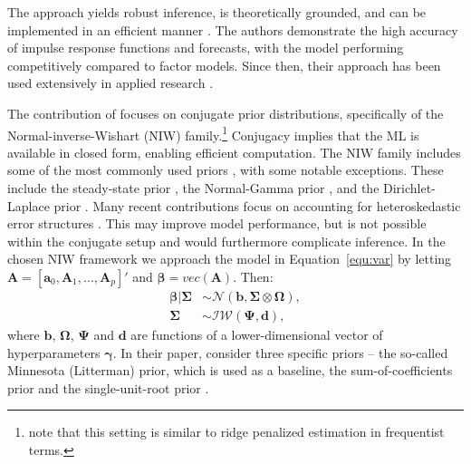 \documentclass[article,nojss]{jss} %
\begin{document}
The approach yields robust inference, is theoretically grounded, and can be implemented in an efficient manner \citep{giannone2015}. The authors demonstrate the high accuracy of impulse response functions and forecasts, with the model performing competitively compared to factor models. Since then, their approach has been used extensively in applied research \citep[see e.g.,][]{miranda-agrippino2015, baumeister2016, altavilla2018, nelson2018, altavilla2019}.

The contribution of \cite{giannone2015} focuses on conjugate prior distributions, specifically of the Normal-inverse-Wishart (NIW) family.\footnote{\cite{demol2008} note that this setting is similar to ridge penalized estimation in frequentist terms.}
Conjugacy implies that the ML is available in closed form, enabling efficient computation.
The NIW family includes some of the most commonly used priors \citep{koop2010, karlsson2013}, with some notable exceptions. These include the steady-state prior \citep{villani2009}, the Normal-Gamma prior \citep{griffin2010, huber2019}, and the Dirichlet-Laplace prior \citep{bhattacharya2015}.
Many recent contributions focus on accounting for heteroskedastic error structures \citep{clark2011, kastner2014, carriero2016}. This may improve model performance, but is not possible within the conjugate setup and would furthermore complicate inference.
In the chosen NIW framework we approach the model in Equation~\ref{equ:var} by letting $\boldsymbol{A} = \left[ \boldsymbol{a}_0, \boldsymbol{A}_1, \dots, \boldsymbol{A}_p \right]'$ and $\boldsymbol{\beta} = vec(\boldsymbol{A})$. Then:
\begin{align}
    \label{equ:niw}
    \boldsymbol{\beta} | \boldsymbol{\Sigma} &\sim \mathcal{N}(\boldsymbol{b}, \boldsymbol{\Sigma} \otimes \boldsymbol{\Omega}), \\
    \boldsymbol{\Sigma} &\sim \mathcal{IW} (\boldsymbol{\Psi}, \boldsymbol{d}), \nonumber
\end{align}
where $\boldsymbol{b}$, $\boldsymbol{\Omega}$, $\boldsymbol{\Psi}$ and $\boldsymbol{d}$ are functions of a lower-dimensional vector of hyperparameters $\boldsymbol{\gamma}$. In their paper, \cite{giannone2015} consider three specific priors -- the so-called Minnesota (Litterman) prior, which is used as a baseline, the sum-of-coefficients prior and the single-unit-root prior \citep[also see][]{sims1998}.
\end{document}
